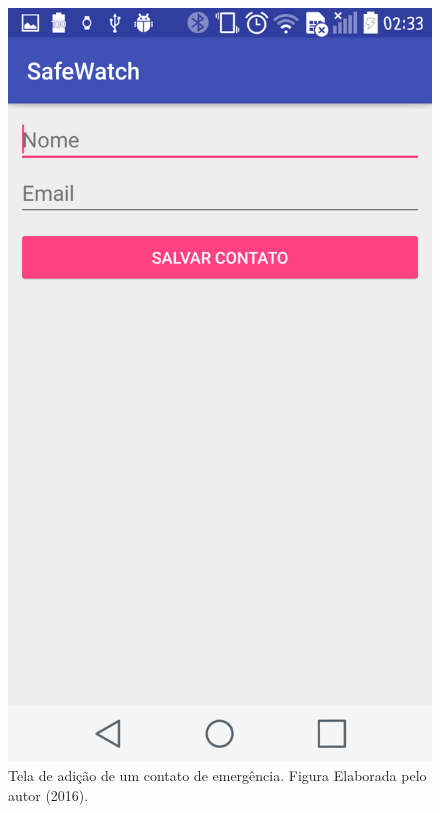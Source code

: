 \begin{figure}[ht]
	\centering
	\includegraphics[scale=0.3]{imagens/tela_adicionar_contatos.png}
	\caption{Tela de adição de um contato de emergência. Figura Elaborada pelo autor (2016).}
	\label{fig:add_contact}
\end{figure} 


